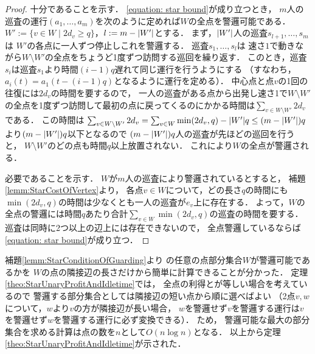 \begin{proof}
  十分であることを示す．
  \eqref{equation: star bound}が成り立つとき，
  $m$人の巡査の運行$(a_1, \ldots, a_m)$を次のように定めれば$W$の全点を警邏可能である．
  $W' := \{ v \in W \mid 2d_v \geq q \}$，$l := m - \lvert{W'}\rvert$とする．
  まず，$\lvert{W'}\rvert$人の巡査$s_{l + 1}, \ldots, s_m$は
  $W'$の各点に一人ずつ停止しこれを警邏する．
  巡査$s_1, \ldots, s_l$は
  速さ$1$で動きながら$W \setminus W'$の全点をちょうど1度ずつ訪問する巡回を繰り返す．
  このとき，巡査$s_i$は巡査$s_1$より時間$(i - 1)q$遅れて同じ運行を行うようにする
  （すなわち，$a_i(t) = a_1(t - (i - 1)q)$となるように運行を定める）．
  中心点と点$v$の1回の往復には$2d_v$の時間を要するので，
  一人の巡査がある点から出発し速さ1で$W \setminus W'$の全点を1度ずつ訪問して最初の点に戻ってくるのにかかる時間は$\sum_{v \in W \setminus W'} 2d_v$である．
  この時間は
  $\sum_{v \in W \setminus W'} 2d_v
    = \sum_{v \in W} \min(2d_v, q) - \lvert{W'}\rvert q
    \leq (m - \lvert{W'}\rvert)q$より$(m - \lvert{W'}\rvert)q$以下となるので
  $(m - \lvert{W'}\rvert)q$人の巡査が先ほどの巡回を行うと，
  $W \setminus W'$のどの点も時間$q$以上放置されない．
  これにより$W$の全点が警邏される．

  必要であることを示す．
  $W$が$m$人の巡査により警邏されているとすると，
  補題\ref{lemm:StarCostOfVertex}より，
  各点$v \in W$について，どの長さ$q$の時間にも
  $\min(2d_v, q)$の時間は少なくとも一人の巡査が$e_v$上に存在する．
  よって，$W$の全点の警邏には時間$q$あたり合計$\sum_{v \in W} \min(2d_v, q)$の巡査の時間を要する．
  巡査は同時に2つ以上の辺上には存在できないので，
  全点警邏しているならば\eqref{equation: star bound}が成り立つ．
\end{proof}


補題\ref{lemm:StarConditionOfGuarding}より
{\graphStar}の任意の点部分集合$W$が警邏可能であるかを
$W$の点の隣接辺の長さだけから簡単に計算できることが分かった．
定理\ref{theo:StarUnaryProfitAndIdletime}では，
全点の利得と{\maxIdletime}が等しい場合を考えているので
警邏する部分集合としては隣接辺の短い点から順に選べばよい
（2点$v, w$について，$w$より$v$の方が隣接辺が長い場合，
$w$を警邏せず$v$を警邏する運行は$v$を警邏せず$w$を警邏する運行に必ず変換できる）．
ため，
警邏可能な最大の部分集合を求める計算は点の数を$n$として$O(n \log n)$となる．
以上から定理\ref{theo:StarUnaryProfitAndIdletime}が示された．
